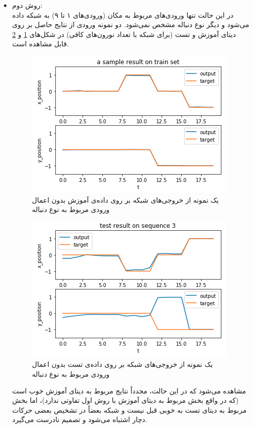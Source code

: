 \documentclass[a4paper]{article}
\begin{document}
\begin{itemize}
	\item روش دوم:\\
در این حالت تنها ورودی‌های مربوط به مکان (ورودی‌های ۱ تا ۹) به شبکه داده می‌شود و دیگر نوع دنباله مشخص نمی‌شود. دو نمونه ورودی از نتایج حاصل بر روی دیتای آموزش و تست (برای شبکه با تعداد نورون‌های کافی) در شکل‌های \ref{fig18} و \ref{fig19} قابل مشاهده است.
\begin{figure}[h!]
	\centering
	\includegraphics[scale=0.7]{fig18.png}
	\caption{یک نمونه از خروجی‌های شبکه بر روی داده‌ی آموزش بدون اعمال ورودی مربوط به نوع دنباله}
	\label{fig18}
\end{figure}

\begin{figure}[h!]
	\centering
	\includegraphics[scale=0.7]{fig19.png}
	\caption{یک نمونه از خروجی‌های شبکه بر روی داده‌ی تست بدون اعمال ورودی مربوط به نوع دنباله}
	\label{fig19}
\end{figure}

	مشاهده می‌شود که در این حالت، مجدداً نتایج مربوط به دیتای آموزش خوب است (که در واقع بخش مربوط به دیتای آموزش با روش اول تفاوتی ندارد)، اما بخش مربوط به دیتای تست به خوبی قبل نیست و شبکه بعضاً در تشخیص بعضی حرکات دچار اشتباه می‌شود و تصمیم نادرست می‌گیرد.
\end{itemize}
\end{document}
